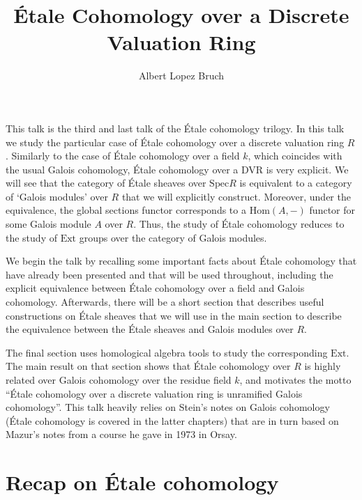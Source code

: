 \documentclass{article}
\title{\'{E}tale Cohomology over a Discrete Valuation Ring}
\author{Albert Lopez Bruch}
\newcommand{\Hom}{\mathrm{Hom}}
\newcommand{\Spec}{\mathrm{Spec}}
\theoremstyle{plain}
\theoremstyle{definition}
\begin{document}
	\maketitle
	This talk is the third and last talk of the \'{E}tale cohomology trilogy. In this talk we study the particular case of \'{E}tale cohomology over a discrete valuation ring $R$. Similarly to the case of \'{E}tale cohomology over a field $k$, which coincides with the usual Galois cohomology, \'{E}tale cohomology over a DVR is very explicit. We will see that the category of \'{E}tale sheaves over $\Spec R$ is equivalent to a category of `Galois modules' over $R$ that we will explicitly construct. Moreover, under the equivalence, the global sections functor corresponds to a $\mathrm{\Hom}(A,-)$ functor for some Galois module $A$ over $R$. Thus, the study of \'{E}tale cohomology reduces to the study of $\mathrm{Ext}$ groups over the category of Galois modules.

    We begin the talk by recalling some important facts about \'{E}tale cohomology that have already been presented and that will be used throughout, including the explicit equivalence between \'{E}tale cohomology over a field and Galois cohomology. Afterwards, there will be a short section that describes useful constructions on \'{E}tale sheaves that we will use in the main section to describe the equivalence between the \'{E}tale sheaves and Galois modules over $R$.
        
    The final section uses homological algebra tools to study the corresponding $\mathrm{Ext}$. The main result on that section shows that \'{E}tale cohomology over $R$ is highly related over Galois cohomology over the residue field $k$, and motivates the motto ``\'{E}tale cohomology over a discrete valuation ring is unramified Galois cohomology''. This talk heavily relies on Stein's notes on Galois cohomology \cite[\S23-27]{Stein} (\'{E}tale cohomology is covered in the latter chapters) that are in turn based on Mazur's notes \cite{Mazur} from a course he gave in 1973 in Orsay.

    \section{Recap on \'{E}tale cohomology}
\end{document}
